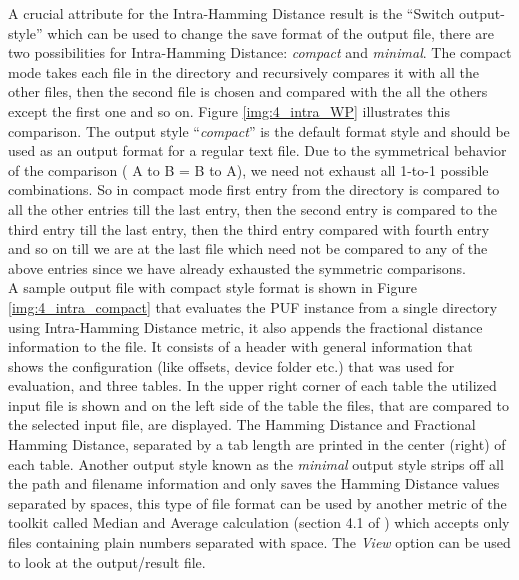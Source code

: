 A crucial attribute for the Intra-Hamming Distance result is the ``Switch output-style'' which can be used to change the save format of the output file, there are two possibilities for Intra-Hamming Distance: \emph{compact} and \emph{minimal}. The compact mode takes each file in the directory and recursively compares it with all the other files, then the second file is chosen and compared with the all the others except the first one and so on. Figure \ref{img:4_intra_WP} illustrates this comparison.  The output style ``\emph{compact}'' is the default format style and should be used
as an output format for a regular text file. Due to the symmetrical behavior of the comparison ( A to B = B to A), we need not exhaust all 1-to-1 possible combinations. So in compact mode first entry from the directory is compared to all the other entries till the last entry, then the second entry is compared to the third entry till the last entry, then the third entry compared with fourth entry and so on till we are at the last file which need not be compared to any of the above entries since we have already exhausted the
symmetric comparisons.\\


A sample output file with compact style format is shown in Figure \ref{img:4_intra_compact} that evaluates the PUF instance from a single directory using Intra-Hamming Distance metric, it also appends the fractional distance information to the file. It consists of a header with general information that shows the configuration (like offsets, device folder etc.) that was used for evaluation, and three tables. In the upper right corner of each table the utilized input file is shown and on the left side of the table
the files, that are compared to the selected input file, are displayed. The Hamming Distance and Fractional Hamming Distance, separated by a tab length are printed in the center (right) of each table. Another output style known as the \emph{minimal} output style strips off all the path and filename information and only saves the Hamming Distance values separated by spaces, this type of file format can be used by another metric of the toolkit called Median and Average calculation (section 4.1
of \cite{71}) which accepts only files containing plain numbers separated with space. The \emph{View} option can be used to look at the output/result file.\\


